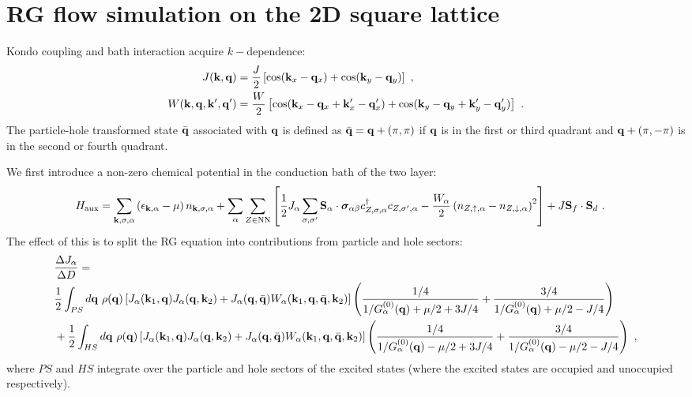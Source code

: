 \documentclass[%
reprint,
superscriptaddress,
groupedaddress,
superscriptaddress,
onecolumn,
10pt
]{revtex4-2}
\begin{document}
\section{RG flow simulation on the 2D square lattice}
Kondo coupling and bath interaction acquire \(k-\)dependence:
\begin{equation}\begin{aligned}
	J({\bf k}, {\bf q}) &= \frac{J}{2}\left[\cos({\bf k}_x - {\bf q}_x) + \cos({\bf k}_y - {\bf q}_y)\right]~,\\
	W({\bf k}, {\bf q}, {\bf k}^\prime, {\bf q}^\prime) &= \frac{W}{2}\left[\cos({\bf k}_x - {\bf q}_x + {\bf k}^\prime_x - {\bf q}^\prime_x) + \cos({\bf k}_y - {\bf q}_y + {\bf k}^\prime_y - {\bf q}^\prime_y)\right]~.
\end{aligned}\end{equation}
The particle-hole transformed state \(\bar{\bf q}\) associated with \({\bf q}\) is defined as \(\bar {\bf q} = {\bf q} + \left(\pi, \pi\right)\) if \({\bf q}\) is in the first or third quadrant and \({\bf q} + \left(\pi, -\pi\right)\) is in the second or fourth quadrant.

We first introduce a non-zero chemical potential in the conduction bath of the two layer:
\begin{equation}\begin{aligned}
	H_\text{aux} &= \sum_{{\bf k},\sigma,\alpha}\left(\epsilon_{{\bf k},\alpha} - \mu\right)n_{{\bf k},\sigma,\alpha} + \sum_\alpha\sum_{Z \in \text{NN}}\left[\frac{1}{2}J_\alpha\sum_{\sigma,\sigma^\prime}{\bf S}_\alpha \cdot {\boldsymbol{\sigma}}_{\alpha\beta}c^\dagger_{Z,\sigma,\alpha}c_{Z,\sigma^\prime,\alpha} - \frac{W_\alpha}{2} \left(n_{Z,\uparrow,\alpha} - n_{Z,\downarrow,\alpha}\right)^2\right] + J{\bf S}_f \cdot {\bf S}_d~.
\end{aligned}\end{equation}
The effect of this is to split the RG equation into contributions from particle and hole sectors:
\begin{equation}\begin{aligned}
	&\frac{\Delta J_\alpha}{\Delta D} =\\
	& \frac{1}{2}\int_{PS} d{\bf q} ~\rho({\bf q}) \left[J_\alpha({\bf k}_1, {\bf q})J_\alpha({\bf q}, {\bf k}_2) + J_\alpha({\bf q}, \bar {\bf q})W_\alpha({\bf k}_1, {\bf q}, \bar {\bf q}, {\bf k}_2)\right]\left(\frac{1/4}{1/G_\alpha^{(0)}({\bf q}) + \mu/2 + 3J/4} + \frac{3/4}{1/G_\alpha^{(0)}({\bf q}) + \mu/2 - J/4}\right)\\
									  &+ \frac{1}{2}\int_{HS} d{\bf q} ~\rho({\bf q}) \left[J_\alpha({\bf k}_1, {\bf q})J_\alpha({\bf q}, {\bf k}_2) + J_\alpha({\bf q}, \bar {\bf q})W_\alpha({\bf k}_1, {\bf q}, \bar {\bf q}, {\bf k}_2)\right]\left(\frac{1/4}{1/G_\alpha^{(0)}({\bf q}) - \mu/2 + 3J/4} + \frac{3/4}{1/G_\alpha^{(0)}({\bf q}) - \mu/2 - J/4}\right)~,
\end{aligned}\end{equation}
where \(PS\) and \(HS\) integrate over the particle and hole sectors of the excited states (where the excited states are occupied and unoccupied respectively).
\end{document}
